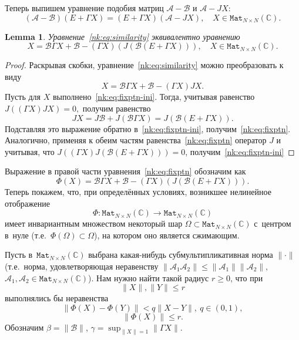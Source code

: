 \documentclass[14pt,a4paper]{extarticle}
\newtheorem{lem}{Lemma}
\theoremstyle{definition}
\begin{document}
Теперь выпишем уравнение подобия матриц \( \mathcal{A} - \mathcal{B} \)
и \( \mathcal{A} - J X \):
\begin{equation}\label{nk:eq:similarity}
    (\mathcal{A-B})(E+\Gamma X) = (E+\Gamma X)(\mathcal{A} - J X), \quad X\in\mathtt{Mat}_{N{\times}N}(\mathbb{C}).
\end{equation}
\begin{lem}
    Уравнение~\eqref{nk:eq:similarity} эквивалентно уравнению
    \begin{equation}\label{nk:eq:fixptn}
        X = \mathcal{B} \Gamma X + \mathcal{B} - (\Gamma X)(J(\mathcal{B} (E + \Gamma X))), \quad X\in\mathtt{Mat}_{N{\times}N}(\mathbb{C}).
    \end{equation}
\end{lem}
\begin{proof}
Раскрывая скобки, уравнение~\eqref{nk:eq:similarity} можно преобразовать к виду
\begin{equation}\label{nk:eq:fixptn-ini}
    X = \mathcal{B} \Gamma X + \mathcal{B} - (\Gamma X) J X.
\end{equation}
Пусть для \( X \) выполнено~\eqref{nk:eq:fixptn-ini}.
Тогда, учитывая равенство \( J\left((\Gamma X)JX\right) = 0, \)
получим равенство
    \begin{equation}\label{nk:eq:jx}
        J X = J\mathcal{B} + J\left(\mathcal{B}\Gamma X\right) = J(\mathcal{B} (E + \Gamma X)).
    \end{equation}
Подставляя это выражение обратно в~\eqref{nk:eq:fixptn-ini},
    получим~\eqref{nk:eq:fixptn}.
Аналогично, применяя к обеим частям равенства~\eqref{nk:eq:fixptn} оператор \( J \)
    и учитывая, что \( J\left( (\Gamma X)J(\mathcal{B} (E + \Gamma X)) \right) = 0 \),
    получим~\eqref{nk:eq:fixptn-ini}
\end{proof}

Выражение в правой части уравнения~\eqref{nk:eq:fixptn} обозначим как
\[
    \Phi(X) = \mathcal{B} \Gamma X + \mathcal{B} - (\Gamma X)(J(\mathcal{B} (E + \Gamma X))).\]
Теперь покажем, что, при определ\"енных условиях,
возникшее нелинейное отображение
\[ \Phi:\mathtt{Mat}_{N{\times}N}(\mathbb{C})\to \mathtt{Mat}_{N{\times}N}(\mathbb{C}) \]
имеет инвариантным множеством
некоторый шар \( \Omega \subset \mathtt{Mat}_{N{\times}N}(\mathbb{C}) \) с~центром в~нуле
(т.е.~\( \Phi(\Omega)\subset\Omega \)),
на котором оно является сжимающим.

Пусть в~\( \mathtt{Mat}_{N{\times}N}(\mathbb{C}) \)
выбрана какая-нибудь суб\-мульти\-пликативная норма \( \|\cdot\| \)
(т.е.~норма, удовле\-творя\-ющая неравенству
 \( \| \mathcal{A}_1\mathcal{A}_2 \| \leq \|\mathcal{A}_1\|\|\mathcal{A}_2\|, \)
 \( \mathcal{A}_1, \mathcal{A}_2 \in \mathtt{Mat}_{N{\times}N}(\mathbb{C}) \)).
Нам нужно найти такой радиус \( r \geq 0 \),
что при \[ \|X\|,\|Y\| \leq r \]
выполнялись бы неравенства
\[ \|\Phi(X) - \Phi(Y)\| < q\|X-Y\|,\ q\in(0,1), \]
\[ \|\Phi(X)\| \leq r. \]
Обозначим
\( \beta = \|\mathcal{B}\| \), \( \gamma = \sup_{\|X\|=1} \|\Gamma X\| \).
\end{document}
